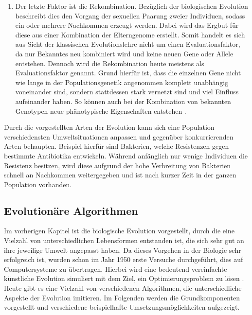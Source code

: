 \begin{enumerate}
	\item Der letzte Faktor ist die Rekombination. Bezüglich der biologischen Evolution beschreibt dies den Vorgang der sexuellen Paarung zweier Individuen, sodass ein oder mehrere Nachkommen erzeugt werden. Dabei wird das Ergbut für diese aus einer Kombination der Elterngenome erstellt. Somit handelt es sich aus Sicht der klassischen Evolutionslehre nicht um einen Evaluationsfaktor, da nur Bekanntes neu kombiniert wird und keine neuen Gene oder Allele entstehen. Dennoch wird die Rekombination heute meistens als Evaluationsfaktor genannt. Grund hierfür ist, dass die einzelnen Gene nicht wie lange in der Populationsgenetik angenommen komplett unabhängig voneinander sind, sondern stattdessen stark vernetzt sind und viel Einfluss aufeinander haben. So können auch bei der Kombination von bekannten Genotypen neue phänotypische Eigenschaften entstehen \cite{weicker2015evolutionare}.
\end{enumerate}
Durch die vorgestellten Arten der Evolution kann sich eine Population verschiedensten Umweltsituationen anpassen und gegenüber konkurrierenden Arten behaupten. Beispiel hierfür sind Bakterien, welche Resistenzen gegen bestimmte Antibiotika entwickeln. Während anfänglich nur wenige Individuen die Resistenz besitzen, wird diese aufgrund der hohe Verbreitung von Bakterien schnell an Nachkommen weitergegeben und ist nach kurzer Zeit in der ganzen Population vorhanden.
 
\subsection{Evolutionäre Algorithmen}
\label{subsec:evolutionary_algorithm}
Im vorherigen Kapitel ist die biologische Evolution vorgestellt, durch die eine Vielzahl von unterschiedlichen Lebensformen entstanden ist, die sich sehr gut an ihre jeweilige Umwelt angepasst haben. Da dieses Vorgehen in der Biologie sehr erfolgreich ist, wurden schon im Jahr 1950 erste Versuche durchgeführt, dies auf Computersysteme zu übertragen. Hierbei wird eine bedeutend vereinfachte künstliche Evolution simuliert mit dem Ziel, ein Optimierungsproblem zu lösen \cite{weicker2015evolutionare}. Heute gibt es eine Vielzahl von verschiedenen Algorithmen, die unterschiedliche Aspekte der Evolution imitieren. Im Folgenden werden die Grundkomponenten vorgestellt und verschiedene beispielhafte Umsetzungsmöglichkeiten aufgezeigt.


